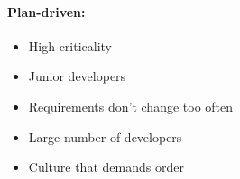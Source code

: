 \documentclass[12pt, a4paper]{article}
\begin{document}
\paragraph{Plan-driven:}
\begin{itemize}
  \item High criticality
  \item Junior developers
  \item Requirements don't change too often
  \item Large number of developers
  \item Culture that demands order
\end{itemize}




\end{document}
